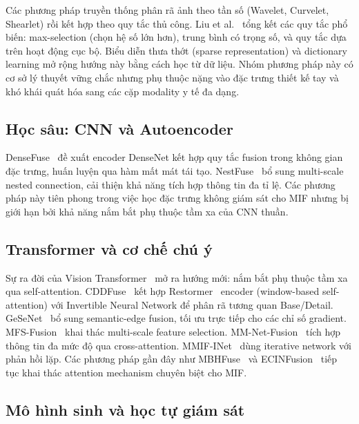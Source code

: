 \documentclass[12pt,a4paper]{article}
\begin{document}
Các phương pháp truyền thống phân rã ảnh theo tần số (Wavelet, Curvelet, Shearlet)
rồi kết hợp theo quy tắc thủ công. Liu et al.~\cite{liu2018survey} tổng kết các
quy tắc phổ biến: max-selection (chọn hệ số lớn hơn), trung bình có trọng số, và
quy tắc dựa trên hoạt động cục bộ. Biểu diễn thưa thớt (sparse representation)
và dictionary learning mở rộng hướng này bằng cách học từ dữ liệu. Nhóm phương
pháp này có cơ sở lý thuyết vững chắc nhưng phụ thuộc nặng vào đặc trưng thiết
kế tay và khó khái quát hóa sang các cặp modality y tế đa dạng.

\subsection{Học sâu: CNN và Autoencoder}

DenseFuse~\cite{li2019densefuse} đề xuất encoder DenseNet kết hợp quy tắc fusion
trong không gian đặc trưng, huấn luyện qua hàm mất mát tái tạo. NestFuse~\cite{li2020nestfuse}
bổ sung multi-scale nested connection, cải thiện khả năng tích hợp thông tin
đa tỉ lệ. Các phương pháp này tiên phong trong việc học đặc trưng không giám sát
cho MIF nhưng bị giới hạn bởi khả năng nắm bắt phụ thuộc tầm xa của CNN thuần.

\subsection{Transformer và cơ chế chú ý}

Sự ra đời của Vision Transformer~\cite{dosovitskiy2020vit} mở ra hướng mới: nắm
bắt phụ thuộc tầm xa qua self-attention. CDDFuse~\cite{zhao2023cddfuse} kết hợp
Restormer~\cite{zamir2022restormer} encoder (window-based self-attention) với
Invertible Neural Network để phân rã tương quan Base/Detail. GeSeNet~\cite{li2023gesenet}
bổ sung semantic-edge fusion, tối ưu trực tiếp cho các chỉ số gradient.
MFS-Fusion~\cite{chen2025mfsfusion} khai thác multi-scale feature selection.
MM-Net-Fusion~\cite{liu2024mmnet} tích hợp thông tin đa mức độ qua cross-attention.
MMIF-INet~\cite{he2025mmifiNet} dùng iterative network với phản hồi lặp. Các
phương pháp gần đây như MBHFuse~\cite{sun2025mbhfuse} và
ECINFusion~\cite{wei2025ecinfusion} tiếp tục khai thác attention mechanism
chuyên biệt cho MIF.

\subsection{Mô hình sinh và học tự giám sát}
\end{document}
